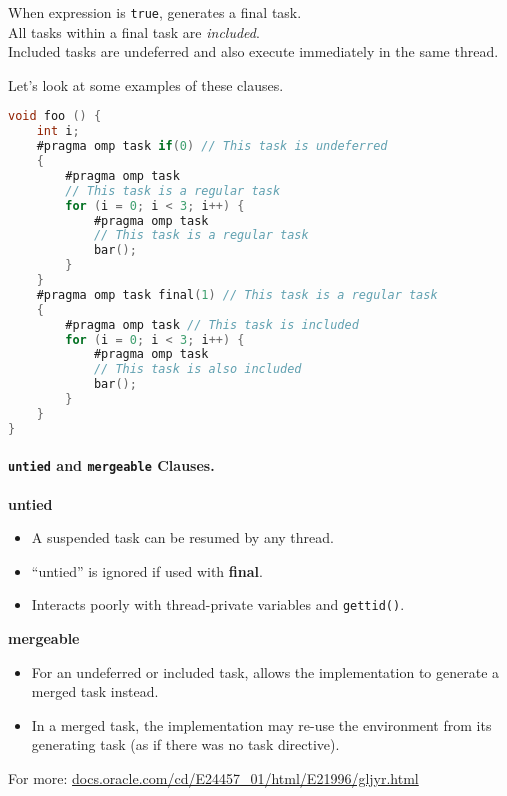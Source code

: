    When expression is {\tt true}, generates a final task.\\
    All tasks within a final task are {\it included}.\\
    Included tasks are undeferred and also execute immediately in the same thread.

Let's look at some examples of these clauses.
  \begin{lstlisting}[language=C]
void foo () {
    int i;
    #pragma omp task if(0) // This task is undeferred
    {
        #pragma omp task
        // This task is a regular task
        for (i = 0; i < 3; i++) {
            #pragma omp task
            // This task is a regular task
            bar();
        }
    }
    #pragma omp task final(1) // This task is a regular task
    {
        #pragma omp task // This task is included
        for (i = 0; i < 3; i++) {
            #pragma omp task
            // This task is also included
            bar();
        }
    }
}
  \end{lstlisting}

\paragraph{{\tt untied} and {\tt mergeable} Clauses.}

\begin{center}
  {\bf untied}
\end{center}
  \begin{itemize}
    \item A suspended task can be resumed by any thread.
    \item ``untied'' is ignored if used with {\bf final}.
    \item Interacts poorly with thread-private variables and {\tt gettid()}.
  \end{itemize}

\begin{center}
  {\bf mergeable}
\end{center}

  \begin{itemize}
    \item For an undeferred or included task,
    allows the implementation to generate a merged task instead.
    \item In a merged task, the implementation may re-use the environment from its generating task (as if there was no task directive).
  \end{itemize}

  For more: \url{docs.oracle.com/cd/E24457_01/html/E21996/gljyr.html}

